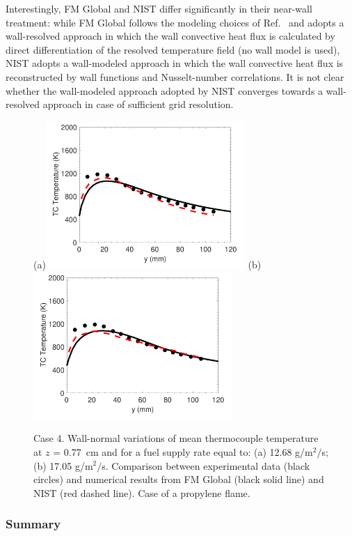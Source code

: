 Interestingly, FM Global and NIST differ significantly in their near-wall treatment: while FM Global follows the modeling choices of Ref.~\cite{Ren:2016} and adopts a wall-resolved approach in which the wall convective heat flux is calculated by direct differentiation of the resolved temperature field (no wall model is used), NIST adopts a wall-modeled approach in which the wall convective heat flux is reconstructed by wall functions and Nusselt-number correlations. It is not clear whether the wall-modeled approach adopted by NIST converges towards a wall-resolved approach in case of sufficient grid resolution.

\begin{figure}
\centering
(a)\includegraphics[height=2.2in]{Figures/Case4-Fig1a.pdf}
(b)\includegraphics[height=2.2in]{Figures/Case4-Fig1b.pdf}
\caption{Case 4. Wall-normal variations of mean thermocouple temperature at $z$ = 0.77~cm and for a fuel supply rate equal to: (a) 12.68 g/m$^2/$s; (b) 17.05 g/m$^2/$s. Comparison between experimental data (black circles) and numerical results from FM Global (black solid line) and NIST (red dashed line). Case of a propylene flame.}
\label{fig:Case4-Fig1}
\end{figure}

\subsubsection{Summary}

